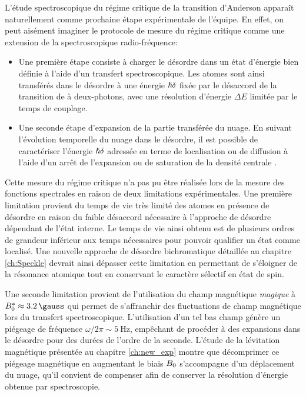 L'étude spectroscopique du régime critique de la transition d'Anderson apparaît naturellement comme prochaine étape expérimentale de l'équipe. En effet, on peut aisément imaginer le protocole de mesure du régime critique comme une extension de la spectroscopique radio-fréquence:
\begin{itemize}
\item[\textendash] Une première étape consiste à charger le désordre dans un état d'énergie bien définie à l'aide d'un transfert spectroscopique. Les atomes sont ainsi transférés dans le désordre à une énergie $\hslash\delta$ fixée par le désaccord de la transition de à deux-photons, avec une résolution d'énergie $\Delta E$ limitée par le temps de couplage.
\item[\textendash] Une seconde étape d'expansion de la partie transférée du nuage. En suivant l'évolution temporelle du nuage dans le désordre, il est possible de caractériser l'énergie $\hslash\delta$ adressée en terme de localisation ou de diffusion à l'aide d'un arrêt de l'expansion ou de saturation de la densité centrale \citep{billy2008direct}\citep{jendrzejewski2012three}.
\end{itemize}

Cette mesure du régime critique n'a pas pu être réalisée lors de la mesure des fonctions spectrales en raison de deux limitations expérimentales. Une première limitation provient du temps de vie très limité des atomes en présence de désordre en raison du faible désaccord nécessaire à l'approche de désordre dépendant de l'état interne. Le temps de vie ainsi obtenu est de plusieurs ordres de grandeur inférieur aux temps nécessaires pour pouvoir qualifier un état comme localisé. Une nouvelle approche de désordre bichromatique détaillée au chapitre \ref{ch:Speckle} devrait ainsi dépasser cette limitation en permettant de s'éloigner de la résonance atomique tout en conservant le caractère sélectif en état de spin. 

Une seconde limitation provient de l'utilisation du champ magnétique \emph{magique} à $\Bzero^*\approx\SI{3.2}{\gauss}$ qui permet de s'affranchir des fluctuations de champ magnétique lors du transfert spectroscopique. L'utilisation d'un tel bas champ génère un piégeage de fréquence $\omega/2\pi\sim\SI{5}{\hertz}$, empêchant de procéder à des expansions dans le désordre pour des durées de l'ordre de la seconde. L'étude de la lévitation magnétique présentée au chapitre \ref{ch:new_exp} montre que décomprimer ce piégeage magnétique en augmentant le biais $B_0$ s'accompagne d'un déplacement du nuage, qu'il convient de compenser afin de conserver la résolution d'énergie obtenue par spectroscopie. 

